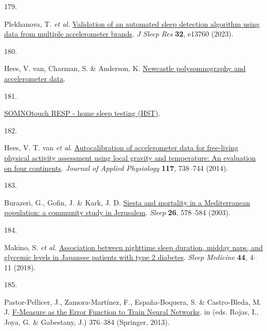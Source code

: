 \documentclass[
  10pt,
]{scrbook}
\newlength{\cslhangindent}
\newlength{\csllabelwidth}
\newlength{\cslentryspacingunit} %
\newenvironment{CSLReferences}[2] %
 {%
  \setlength{\parindent}{0pt}
  \ifodd #1
  \let\oldpar\par
  \def\par{\hangindent=\cslhangindent\oldpar}
  \fi
  \setlength{\parskip}{#2\cslentryspacingunit}
 }%
 {}
\newcommand{\CSLLeftMargin}[1]{\parbox[t]{\csllabelwidth}{#1}}
\newcommand{\CSLRightInline}[1]{\parbox[t]{\linewidth - \csllabelwidth}{#1}\break}
\let\originaltextbf\textbf
\renewcommand{\textbf}[1]{\textcolor{color1}{\textsf{\originaltextbf{#1}}}}
\begin{document}
\begin{CSLReferences}{0}{0}
\leavevmode{}%
\CSLLeftMargin{179. }%
\CSLRightInline{Plekhanova, T. \emph{et al.}
\href{https://doi.org/10.1111/jsr.13760}{Validation of an automated
sleep detection algorithm using data from multiple accelerometer
brands}. \emph{J Sleep Res} \textbf{32}, e13760 (2023).}

\leavevmode{}%
\CSLLeftMargin{180. }%
\CSLRightInline{Hees, V. van, Charman, S. \& Anderson, K.
\href{https://doi.org/10.5281/zenodo.1160410}{Newcastle polysomnography
and accelerometer data}.}

\leavevmode{}%
\CSLLeftMargin{181. }%
\CSLRightInline{\href{https://somnomedics.de/enus/somnomedics-diagnostic-devices/sleep-diagnostics/home-sleep-testing-hst/somnotouch-resp-home-sleep-testing-hst/}{SOMNOtouch{\texttrademark}
RESP - home sleep testing (HST)}.}

\leavevmode{}%
\CSLLeftMargin{182. }%
\CSLRightInline{Hees, V. T. van \emph{et al.}
\href{https://doi.org/10.1152/japplphysiol.00421.2014}{Autocalibration
of accelerometer data for free-living physical activity assessment using
local gravity and temperature: An evaluation on four continents}.
\emph{Journal of Applied Physiology} \textbf{117}, 738--744 (2014).}

\leavevmode{}%
\CSLLeftMargin{183. }%
\CSLRightInline{Burazeri, G., Gofin, J. \& Kark, J. D.
\href{https://doi.org/10.1093/sleep/26.5.578}{Siesta and mortality in a
Mediterranean population: a community study in Jerusalem}. \emph{Sleep}
\textbf{26}, 578--584 (2003).}

\leavevmode{}%
\CSLLeftMargin{184. }%
\CSLRightInline{Makino, S. \emph{et al.}
\href{https://doi.org/10.1016/j.sleep.2017.11.1124}{Association between
nighttime sleep duration, midday naps, and glycemic levels in Japanese
patients with type 2 diabetes}. \emph{Sleep Medicine} \textbf{44}, 4--11
(2018).}

\leavevmode{}%
\CSLLeftMargin{185. }%
\CSLRightInline{Pastor-Pellicer, J., Zamora-Martínez, F.,
España-Boquera, S. \& Castro-Bleda, M. J.
\href{https://doi.org/10.1007/978-3-642-38679-4_37}{F-Measure as the
Error Function to Train Neural Networks}. in (eds. Rojas, I., Joya, G.
\& Gabestany, J.) 376--384 (Springer, 2013).}


\end{CSLReferences}
\end{document}
